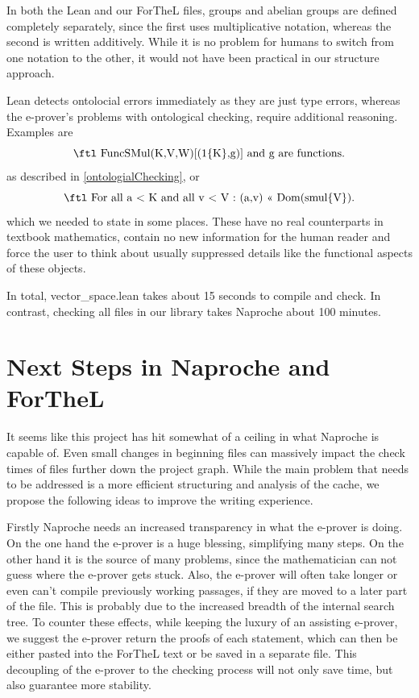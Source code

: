 \documentclass[11pt]{article}
\begin{document}
In both the Lean and our ForTheL files, groups and abelian groups are defined completely separately, since the first uses multiplicative notation, whereas the second is written additively.
While it is no problem for humans to switch from one notation to the other, it would not have been practical in our {\ftl structure} approach.

Lean detects ontolocial errors immediately as they are just type errors, whereas the e-prover's problems with ontological checking, require additional reasoning. Examples are
$$\text{\ftl FuncSMul(K,V,W)[(1\{K\},g)] and g are functions.}$$
as described in \ref{ontologialChecking}, or
$$\text{\ftl For all a < K and all v < V : (a,v) << Dom(smul\{V\}).}$$
which we needed to state in some places.
These have no real counterparts in textbook mathematics, contain no new information for the human reader and force the user to think about usually suppressed details like the functional aspects of these objects.

In total, vector\_space.lean takes about 15 seconds to compile and check. In contrast, checking all files in our library takes Naproche about 100 minutes.


\newpage 
\section{Next Steps in Naproche and ForTheL}\label{nextsteps}

It seems like this project has hit somewhat of a ceiling in what Naproche is capable of. 
Even small changes in beginning files can massively impact the check times of files further down the project graph.
While the main problem that needs to be addressed is a more efficient structuring and analysis of the cache, we propose the following ideas to improve the writing experience.

Firstly Naproche needs an increased transparency in what the e-prover is doing. On the one hand the e-prover is a huge blessing, simplifying many steps. On the other hand it is the source of many problems, since the mathematician can not guess where the e-prover gets stuck. Also, the e-prover will often take longer or even can't compile previously working passages, if they are moved to a later part of the file. This is probably due to the increased breadth of the internal search tree. To counter these effects, while keeping the luxury of an assisting e-prover, we suggest the e-prover return the proofs of each statement, which can then be either pasted into the ForTheL text or be saved in a separate file. This decoupling of the e-prover to the checking process will not only save time, but also guarantee more stability.
\end{document}
